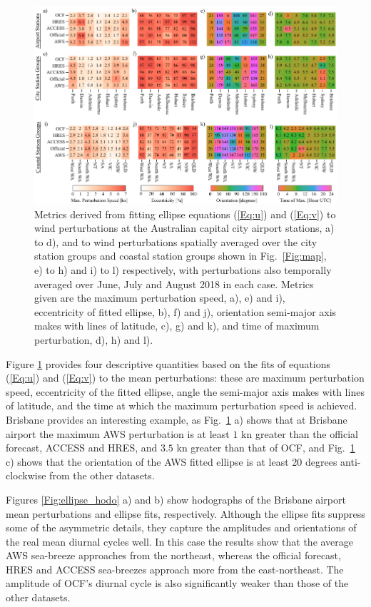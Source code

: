 \documentclass[twocol]{ametsoc}
\begin{document}
\begin{figure}
\centering
\includegraphics[width=39pc]{ellipse_fits.pdf}
\caption{Metrics derived from fitting ellipse equations (\ref{Eq:u}) and (\ref{Eq:v}) to wind perturbations at the Australian capital city airport stations, a) to d), and to wind perturbations spatially averaged over the city station groups and coastal station groups shown in Fig.~\ref{Fig:map}, e) to h) and i) to l) respectively, with perturbations also temporally averaged over June, July and August 2018 in each case. Metrics given are the maximum perturbation speed, a), e) and i), eccentricity of fitted ellipse, b), f) and j), orientation semi-major axis makes with lines of latitude, c), g) and k), and time of maximum perturbation, d), h) and l).}
\label{Fig:ellipse_fits}
\end{figure}

Figure \ref{Fig:ellipse_fits} provides four descriptive quantities based on the fits of equations (\ref{Eq:u}) and (\ref{Eq:v}) to the mean perturbations: these are maximum perturbation speed, eccentricity of the fitted ellipse, angle the semi-major axis makes with lines of latitude, and the time at which the maximum perturbation speed is achieved. Brisbane provides an interesting example, as Fig.~\ref{Fig:ellipse_fits} a) shows that at Brisbane airport the maximum AWS perturbation is at least $1$ kn greater than the official forecast, ACCESS and HRES, and $3.5$ kn greater than that of OCF, and Fig.~\ref{Fig:ellipse_fits} c) shows that the orientation of the AWS fitted ellipse is at least 20 degrees anti-clockwise from the other datasets. 

Figures \ref{Fig:ellipse_hodo} a) and b) show hodographs of the Brisbane airport mean perturbations and ellipse fits, respectively. Although the ellipse fits suppress some of the asymmetric details, they capture the amplitudes and orientations of the real mean diurnal cycles well. In this case the results show that the average AWS sea-breeze approaches from the northeast, whereas the official forecast, HRES and ACCESS sea-breezes approach more from the east-northeast. The amplitude of OCF's diurnal cycle is also significantly weaker than those of the other datasets.  
\end{document}
